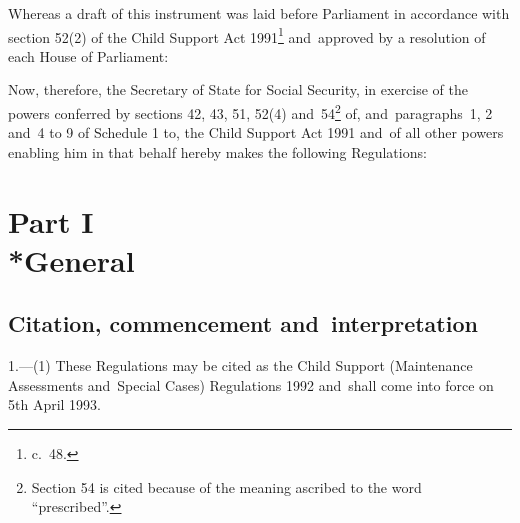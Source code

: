 \documentclass[12pt,a4paper]{article}
\title{\regstitle}
\author{S.I. 1992 No. 1815}
\date{Made 20th July 1992\\Coming into force 5th April 1993}
\begin{document}
\maketitle


\medskip

\noindent
 Whereas a draft of this instrument was laid before Parliament in accordance with section 52(2) of the Child Support Act 1991\footnote{ c.~48.} and~approved by a resolution of each House of Parliament:

Now, therefore, the Secretary of State for Social Security, in exercise of the powers conferred by sections 42, 43, 51, 52(4) and~54\footnote{\frenchspacing Section 54 is cited because of the meaning ascribed to the word “prescribed”.} of, and~paragraphs~1, 2 and~4 to 9 of Schedule 1 to, the Child Support Act 1991 and~of all other powers enabling him in that behalf hereby makes the following Regulations: 

{\sloppy

\tableofcontents

}

\vfill

\setcounter{secnumdepth}{-2}

\section[Part I --- General]{Part I\\*General}

\renewcommand\parthead{--- Part I}

\subsection[1. Citation, commencement and~interpretation]{Citation, commencement and~interpretation}

1.—(1) These Regulations may be cited as the Child Support (Maintenance Assessments and~Special Cases) Regulations 1992 and~shall come into force on 5th April 1993.
\end{document}
